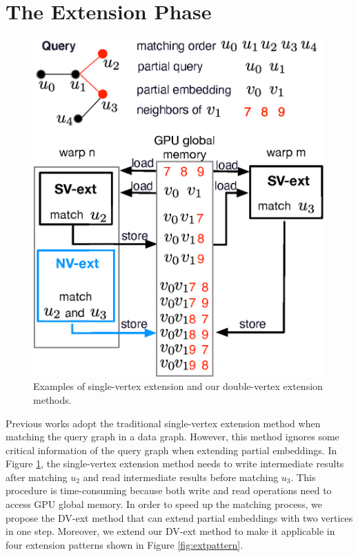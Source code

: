 \section{The Extension Phase}
\begin{figure}
\centering
\includegraphics[width=0.9\columnwidth]{./figure/doubleext.eps}
\caption{Examples of single-vertex extension and our double-vertex extension methods.}	
\label{fig:doubleext}
\end{figure}
Previous works \cite{zeng2020gsi,sun2020subgraph} adopt the traditional single-vertex extension method when matching the query graph in a data graph. However, this method ignores some critical information of the query graph when extending partial embeddings. In Figure \ref{fig:doubleext}, the single-vertex extension method needs to write intermediate results after matching $u_2$ and read intermediate results before matching $u_3$. This procedure is time-consuming because both write and read operations need to access GPU global memory. In order to speed up the matching process, we propose the DV-ext method that can extend partial embeddings with two vertices in one step. Moreover, we extend our DV-ext method to make it applicable in four extension patterns shown in Figure \ref{fig:extpattern}.

